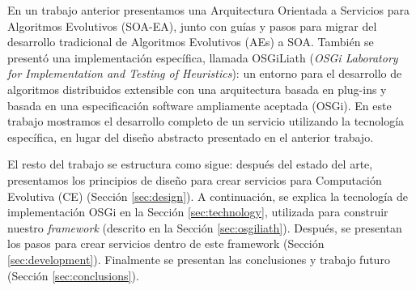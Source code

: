 \documentclass[runningheads]{llncs}
\begin{document}

En un trabajo anterior \cite{OSGILIATH} presentamos una
Arquitectura Orientada a Servicios para Algoritmos Evolutivos
(SOA-EA), junto con guías y pasos para migrar del desarrollo
tradicional de Algoritmos Evolutivos (AEs) a SOA. También se presentó
una implementación específica, llamada OSGiLiath ({\em OSGi Laboratory
  for Implementation and Testing of Heuristics}): 
  un entorno para el
desarrollo de algoritmos distribuidos extensible con una arquitectura
basada en plug-ins y basada en una especificación software ampliamente
aceptada (OSGi). En este trabajo mostramos el desarrollo completo de
un servicio utilizando la tecnología específica, en lugar del diseño
abstracto presentado en el anterior trabajo. %

El resto del trabajo se estructura como sigue: después del estado del
arte, presentamos los principios de diseño para crear servicios para
Computación Evolutiva (CE) (Sección \ref{sec:design}). A continuación,
se explica la tecnología de implementación OSGi en la Sección
\ref{sec:technology}, utilizada para construir nuestro {\em framework}
(descrito en la Sección \ref{sec:osgiliath}). Después, se presentan
los pasos para crear servicios dentro de este framework (Sección
\ref{sec:development}). Finalmente se presentan las conclusiones y
trabajo futuro (Sección \ref{sec:conclusions}). %
\end{document}
